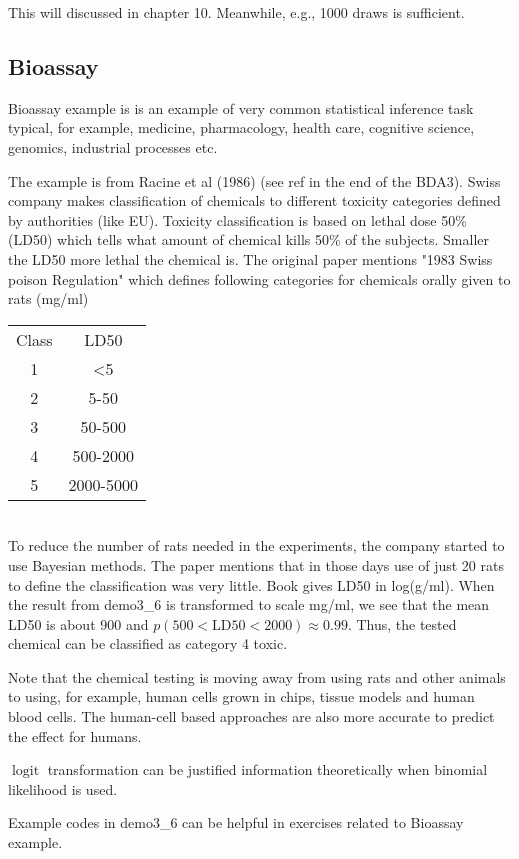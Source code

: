 \documentclass[a4paper,11pt,english]{article}
\DeclareMathOperator{\logit}{logit}
\begin{document}
This will discussed in chapter 10. Meanwhile, e.g., 1000 draws is sufficient.

\subsection*{Bioassay}

Bioassay example is is an example of very common statistical inference
task typical, for example, medicine, pharmacology, health care,
cognitive science, genomics, industrial processes etc.

The example is from Racine et al (1986) (see ref in the end of the
BDA3). Swiss company makes classification of chemicals to different
toxicity categories defined by authorities (like EU). Toxicity
classification is based on lethal dose 50\% (LD50) which tells what
amount of chemical kills 50\% of the subjects. Smaller the LD50 more
lethal the chemical is. The original paper mentions "1983 Swiss poison
Regulation" which defines following categories for chemicals orally
given to rats (mg/ml)\\
\begin{tabular}{c c}
Class & LD50 \\
1 & <5 \\
     2  &         5-50 \\
     3  &        50-500 \\
     4  &       500-2000 \\
     5  &      2000-5000 
\end{tabular}\\
To reduce the number of rats needed in the experiments, the company
started to use Bayesian methods. The paper mentions that in those days
use of just 20 rats to define the classification was very little.
%
Book gives LD50 in log(g/ml). When the result from demo3\_6 is
transformed to scale mg/ml, we see that the mean LD50 is about 900 and
$p(500<\text{LD50}<2000)\approx 0.99$. Thus, the tested chemical can be
classified as category 4 toxic.

Note that the chemical testing is moving away from using rats and
other animals to using, for example, human cells grown in chips,
tissue models and human blood cells. The human-cell based approaches
are also more accurate to predict the effect for humans.

$\logit$ transformation can be justified information theoretically
when binomial likelihood is used.

Example codes in demo3\_6 can be helpful in exercises related to
Bioassay example.
\end{document}
